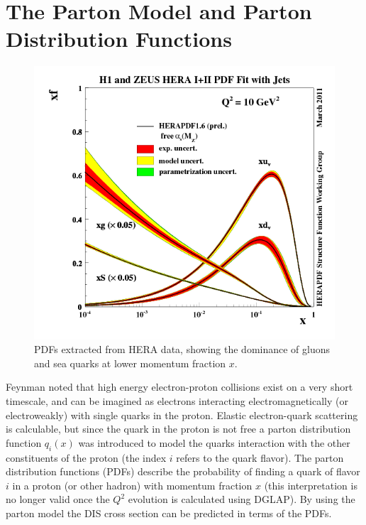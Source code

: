 \section{The Parton Model and Parton Distribution Functions}

\begin{figure}
	\centering
	\includegraphics[width = \textwidth]{image/plots/introduction/pdf.png}	
	\caption[A recent PDF extraction from HERA data.]{PDFs extracted from HERA data, showing the dominance of gluons and sea quarks at lower momentum fraction $x$.}
	\label{fig:pdfs}
\end{figure}

Feynman noted that high energy electron-proton collisions exist on a very short timescale, and can be imagined as electrons interacting electromagnetically (or electroweakly) with single quarks in the proton.  Elastic electron-quark scattering is calculable, but since the quark in the proton is not free a parton distribution function $q_i(x)$ was introduced to model the quarks interaction with the other constituents of the proton (the index $i$ refers to the quark flavor).  The parton distribution functions (PDFs) describe the probability of finding a quark of flavor $i$ in a proton (or other hadron) with momentum fraction $x$ (this interpretation is no longer valid once the $Q^2$ evolution is calculated using DGLAP).  By using the parton model the DIS cross section can be predicted in terms of the PDFs.    

